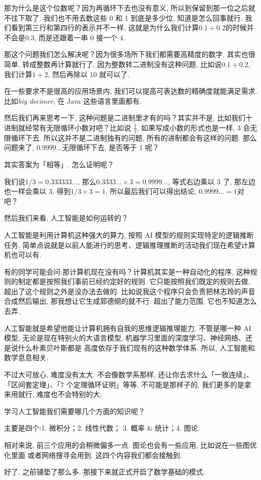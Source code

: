 那为什么是这个位数呢？因为再循环下去也没有意义, 所以到保留到那一位之后就不往下取了. 我们也不用去数这些 0 和 1 到底是多少位, 知道是怎么回事就行. 我们看到第三行和第四行的表示并不一样, 这就是为什么我们计算$0.1+0.2$的时候并不会是$0.3$, 而是还跟着一串 0 接一个 4. 

那这个问题我们怎么解决呢？因为很多场所下我们都需要高精度的数字. 其实也很简单, 转成整数再计算就行了, 因为整数转二进制没有这种问题, 比如说$0.1+0.2$, 我们计算$1+2$, 然后再除以 10 就可以了. 

在一些要求不是很高的应用场景内, 我们可以提高可表达数的精确度就能满足需求. 比如\textit{big decimer},  在 Java 这些语言里面都有. 

然后我们再来思考一下, 这种问题是二进制里才有的吗？其实并不是, 比如我们十进制就经常有无限循环小数对吧？比如说 $\frac{1}{3}$,  如果写成小数的形式也是一样, 3 会无限循环下去. 所以这并不是二进制独有的问题, 所有的进制都会有这样的问题. 那么问题来了, $0.9999 ... $无限循环下去, 是否等于 1 呢？

其实答案为「相等」. 怎么证明呢？

我们说$1/3 = 0.333333 ... $,  那么$0.3333 ...  \times 3 = 0.9999 ... $,  等式右边乘以 3 了, 那左边也一样会乘以 3,  得到$1/3 \times 3 =1$. 所以最后我们可以得出结论, $0.9999 ... =1$对吧？

然后我们来看, 人工智能是如何运转的？

人工智能是利用计算机这种强大的算力, 按照 AI 模型的规则实现特定的逻辑推断任务. 简单点说就是以前人能进行的思考、逻辑推理推断的活动我们现在希望计算机也可以有. 

有的同学可能会问:那计算机现在没有吗？计算机其实是一种自动化的程序, 这种规则的制定都是按照我们事前已经约定好的规则. 它只能按照我们既定的规则去做, 超出了这个规则之外是没办法去做的. 比如说我这个程序只会负责把林志玲的声音合成然后输出, 那我想让它生成郭德纲的就不行. 超出了能力范围, 它也不知道怎么去弄. 

人工智能就是希望他能让计算机拥有自我的思维逻辑推理能力, 不管是哪一种 AI 模型, 无论是现在特别火的大语言模型, 机器学习里面的深度学习、神经网络、还是说什么朴素贝叶斯都是
高度依存于我们现有的这种数学体系. 所以, 人工智能和数学息息相关. 

不过大可放心, 难度没有太大. 不会像数学系那样, 还让你去求什么「一致连续」、「区间套定理」、「7 个定理循环证明」等等. 不可能是那样子的, 我们更多的是拿来用就行, 难度也不会特别的大. 

学习人工智能我们需要哪几个方面的知识呢？

主要是四个:1. 微积分；2. 线性代数； 3. 概率 \& 统计；4. 图论. 

相对来说, 前三个应用的会稍微偏多一点. 图论也会有一些应用, 比如说在一些图优化里面
或者网络搜寻会用到. 这四个内容我们都会接触到. 

好了, 之前铺垫了那么多. 那接下来就正式开启了数学基础的模式. 